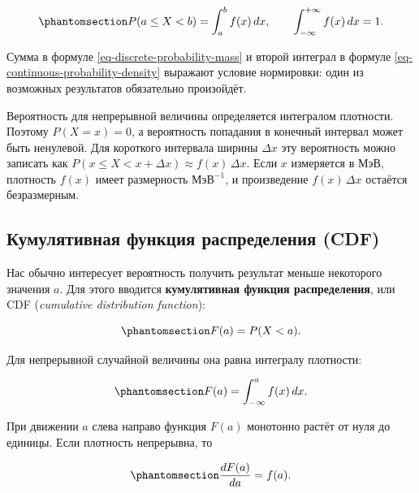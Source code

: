 \documentclass[
  russian,
  11pt,
  a4paper,
  open=any]{scrbook}
\begin{document}
\begin{equation}\protect\phantomsection\label{eq-continuous-probability-density}{
P(a\leq X<b)=\int_a^b f(x)\,dx,
\qquad
\int_{-\infty}^{+\infty}f(x)\,dx=1.
}\end{equation}

Сумма в формуле \ref{eq-discrete-probability-mass} и второй интеграл в
формуле \ref{eq-continuous-probability-density} выражают условие
нормировки: один из возможных результатов обязательно произойдёт.

Вероятность для непрерывной величины определяется интегралом плотности.
Поэтому \(P(X=x)=0\), а вероятность попадания в конечный интервал может
быть ненулевой. Для короткого интервала ширины \(\Delta x\) эту
вероятность можно записать как
\(P(x\leq X<x+\Delta x)\approx f(x)\,\Delta x\). Если \(x\) измеряется в
МэВ, плотность \(f(x)\) имеет размерность \(\text{МэВ}^{-1}\), и
произведение \(f(x)\,\Delta x\) остаётся безразмерным.

\subsection{Кумулятивная функция распределения
(CDF)}\label{ux43aux443ux43cux443ux43bux44fux442ux438ux432ux43dux430ux44f-ux444ux443ux43dux43aux446ux438ux44f-ux440ux430ux441ux43fux440ux435ux434ux435ux43bux435ux43dux438ux44f-cdf}

Нас обычно интересует вероятность получить результат меньше некоторого
значения \(a\). Для этого вводится \textbf{кумулятивная функция
распределения}, или CDF (\emph{cumulative distribution function}):

\begin{equation}\protect\phantomsection\label{eq-cumulative-distribution}{
F(a)=P(X<a).
}\end{equation}

Для непрерывной случайной величины она равна интегралу плотности:

\begin{equation}\protect\phantomsection\label{eq-cdf-from-density}{
F(a)=\int_{-\infty}^{a}f(x)\,dx.
}\end{equation}

При движении \(a\) слева направо функция \(F(a)\) монотонно растёт от
нуля до единицы. Если плотность непрерывна, то

\begin{equation}\protect\phantomsection\label{eq-density-from-cdf}{
\frac{dF(a)}{da}=f(a).
}\end{equation}
\end{document}
